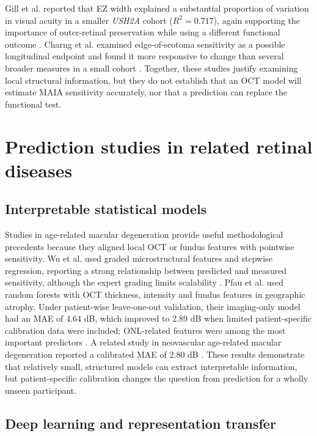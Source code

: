 Gill et al. reported that EZ width explained a substantial proportion of variation in visual acuity in a smaller \textit{USH2A} cohort ($R^2=0.717$), again supporting the importance of outer-retinal preservation while using a different functional outcome \cite{Gill2022}. Charng et al. examined edge-of-scotoma sensitivity as a possible longitudinal endpoint and found it more responsive to change than several broader measures in a small cohort \cite{Charng2020}. Together, these studies justify examining local structural information, but they do not establish that an OCT model will estimate MAIA sensitivity accurately, nor that a prediction can replace the functional test.

\section{Prediction studies in related retinal diseases}

\subsection{Interpretable statistical models}

Studies in age-related macular degeneration provide useful methodological precedents because they aligned local OCT or fundus features with pointwise sensitivity. Wu et al. used graded microstructural features and stepwise regression, reporting a strong relationship between predicted and measured sensitivity, although the expert grading limits scalability \cite{Wu2014}. Pfau et al. used random forests with OCT thickness, intensity and fundus features in geographic atrophy. Under patient-wise leave-one-out validation, their imaging-only model had an MAE of 4.64 dB, which improved to 2.89 dB when limited patient-specific calibration data were included; ONL-related features were among the most important predictors \cite{Pfau2020}. A related study in neovascular age-related macular degeneration reported a calibrated MAE of 2.80 dB \cite{vonderEmde2019}. These results demonstrate that relatively small, structured models can extract interpretable information, but patient-specific calibration changes the question from prediction for a wholly unseen participant.

\subsection{Deep learning and representation transfer}

